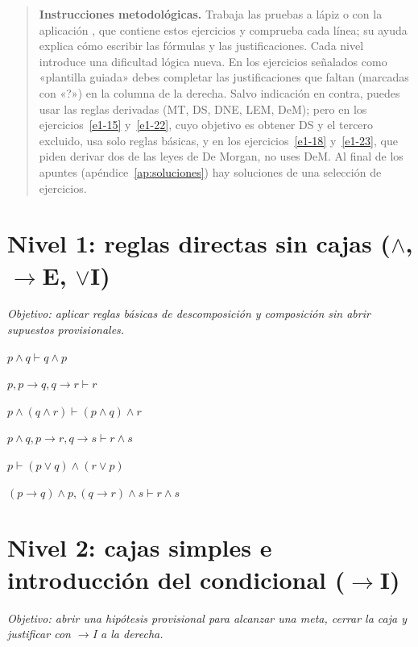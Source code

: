 \begin{quote}
\small \textbf{Instrucciones metodológicas.} Trabaja las pruebas a lápiz o con la aplicación \appdeduccion{}, que contiene estos ejercicios y comprueba cada línea; su ayuda explica cómo escribir las fórmulas y las justificaciones. Cada nivel introduce una dificultad lógica nueva. En los ejercicios señalados como «plantilla guiada» debes completar las justificaciones que faltan (marcadas con «?») en la columna de la derecha. Salvo indicación en contra, puedes usar las reglas derivadas (MT, DS, DNE, LEM, DeM); pero en los ejercicios~\ref{e1-15} y~\ref{e1-22}, cuyo objetivo es obtener DS y el tercero excluido, usa solo reglas básicas, y en los ejercicios~\ref{e1-18} y~\ref{e1-23}, que piden derivar dos de las leyes de De Morgan, no uses DeM. Al final de los apuntes (apéndice~\ref{ap:soluciones}) hay soluciones de una selección de ejercicios.
\end{quote}

\section*{Nivel 1: reglas directas sin cajas ($\land$, $\to$E, $\lor$I)}
\textit{Objetivo: aplicar reglas básicas de descomposición y composición sin abrir supuestos provisionales.}

\begin{pregunta}\label{e1-1}
$p \land q \vdash q \land p$
\end{pregunta}
\begin{pregunta}\label{e1-2}
$p, p \to q, q \to r \vdash r$
\end{pregunta}
\begin{pregunta}\label{e1-3}
$p \land (q \land r) \vdash (p \land q) \land r$
\end{pregunta}
\begin{pregunta}\label{e1-4}
$p \land q, p \to r, q \to s \vdash r \land s$
\end{pregunta}
\begin{pregunta}\label{e1-5}
$p \vdash (p \lor q) \land (r \lor p)$
\end{pregunta}
\begin{pregunta}\label{e1-6}
$(p \to q) \land p, (q \to r) \land s \vdash r \land s$
\end{pregunta}

\section*{Nivel 2: cajas simples e introducción del condicional ($\to$I)}
\textit{Objetivo: abrir una hipótesis provisional para alcanzar una meta, cerrar la caja y justificar con $\to$I a la derecha.}

